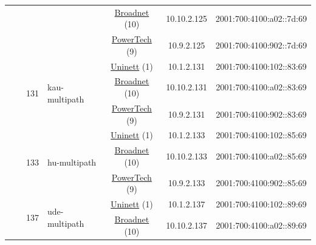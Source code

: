 \begin{small}
\begin{center}
\begin{longtable}{|c|c|c|c|c|c|c|c|}
  &  &  &  & \multicolumn{2}{|c|}{\tiny{\href{https://www.broadnet.no}{Broadnet} (10)}} & \tiny{10.10.2.125} & \tiny{2001:700:4100:a02::7d:69} \\* \cline{5-5}\cline{6-6}\cline{7-7}\cline{8-8}
  &  &  &  & \multicolumn{2}{|c|}{\tiny{\href{http://www.powertech.no}{PowerTech} (9)}} & \tiny{10.9.2.125} & \tiny{2001:700:4100:902::7d:69} \\* \cline{3-3}\cline{4-4}\cline{5-5}\cline{6-6}\cline{7-7}\cline{8-8}
  &  & \multirow{3}{*}{\tiny{131}} & \multicolumn{1}{|l|}{\multirow{3}{*}{\tiny{kau-multipath}}} & \multicolumn{2}{|c|}{\tiny{\href{https://www.uninett.no}{Uninett} (1)}} & \tiny{10.1.2.131} & \tiny{2001:700:4100:102::83:69} \\* \cline{5-5}\cline{6-6}\cline{7-7}\cline{8-8}
  &  &  &  & \multicolumn{2}{|c|}{\tiny{\href{https://www.broadnet.no}{Broadnet} (10)}} & \tiny{10.10.2.131} & \tiny{2001:700:4100:a02::83:69} \\* \cline{5-5}\cline{6-6}\cline{7-7}\cline{8-8}
  &  &  &  & \multicolumn{2}{|c|}{\tiny{\href{http://www.powertech.no}{PowerTech} (9)}} & \tiny{10.9.2.131} & \tiny{2001:700:4100:902::83:69} \\* \cline{3-3}\cline{4-4}\cline{5-5}\cline{6-6}\cline{7-7}\cline{8-8}
  &  & \multirow{3}{*}{\tiny{133}} & \multicolumn{1}{|l|}{\multirow{3}{*}{\tiny{hu-multipath}}} & \multicolumn{2}{|c|}{\tiny{\href{https://www.uninett.no}{Uninett} (1)}} & \tiny{10.1.2.133} & \tiny{2001:700:4100:102::85:69} \\* \cline{5-5}\cline{6-6}\cline{7-7}\cline{8-8}
  &  &  &  & \multicolumn{2}{|c|}{\tiny{\href{https://www.broadnet.no}{Broadnet} (10)}} & \tiny{10.10.2.133} & \tiny{2001:700:4100:a02::85:69} \\* \cline{5-5}\cline{6-6}\cline{7-7}\cline{8-8}
  &  &  &  & \multicolumn{2}{|c|}{\tiny{\href{http://www.powertech.no}{PowerTech} (9)}} & \tiny{10.9.2.133} & \tiny{2001:700:4100:902::85:69} \\* \cline{3-3}\cline{4-4}\cline{5-5}\cline{6-6}\cline{7-7}\cline{8-8}
  &  & \multirow{3}{*}{\tiny{137}} & \multicolumn{1}{|l|}{\multirow{3}{*}{\tiny{ude-multipath}}} & \multicolumn{2}{|c|}{\tiny{\href{https://www.uninett.no}{Uninett} (1)}} & \tiny{10.1.2.137} & \tiny{2001:700:4100:102::89:69} \\* \cline{5-5}\cline{6-6}\cline{7-7}\cline{8-8}
  &  &  &  & \multicolumn{2}{|c|}{\tiny{\href{https://www.broadnet.no}{Broadnet} (10)}} & \tiny{10.10.2.137} & \tiny{2001:700:4100:a02::89:69} \\* \cline{5-5}\cline{6-6}\cline{7-7}\cline{8-8}

\end{longtable}
\end{center}
\end{small}
